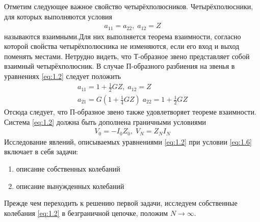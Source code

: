 Отметим следующее важное свойство четырёхполюсников. Четырёхполюсники, для которых выполняются условия
\begin{equation}
	\label{eq:1.4}
	\begin{gathered}
		a_{11}=a_{22},\; 
		a_{12}=Z
	\end{gathered}
\end{equation}
называются взаимными.Для них выполняется теорема взаимности, согласно которой свойства четырёхполюсника не изменяются, если его вход и выход поменять местами. Нетрудно видеть, что Т-образное звено представляет собой взаимный четырёхполюсник. В случае П-образного разбиения на звенья в уравнениях \eqref{eq:1.2} следует положить 
\begin{equation}
	\label{eq:1.5}
	\begin{gathered}
		a_{11}=1+\frac{1}{2}GZ,\; 
		a_{12}=Z\\
		a_{21}=G\left(1+\frac{1}{4}GZ\right)\;
		a_{22}=1+\frac{1}{2}GZ
	\end{gathered}
\end{equation}
Отсюда следует, что П-образное звено также удовлетворяет теореме взаимности. 
Система \eqref{eq:1.2} должна быть дополнена граничными условиями
\begin{equation}
	\label{eq:1.6}
	\begin{gathered}
		V_0=-I_0Z_0,\; 
		V_N=Z_NI_N
	\end{gathered}
\end{equation}
Исследование явлений, описываемых уравнениями \eqref{eq:1.2} при условии \eqref{eq:1.6} включает в себя задачи:
\begin{enumerate}
	\item описание собственных колебаний
	\item описание вынужденных колебаний
\end{enumerate}
Прежде чем переходить к решению первой задачи, исследуем собственные колебания \eqref{eq:1.2} в безграничной цепочке, положим $N\rightarrow\infty$.

